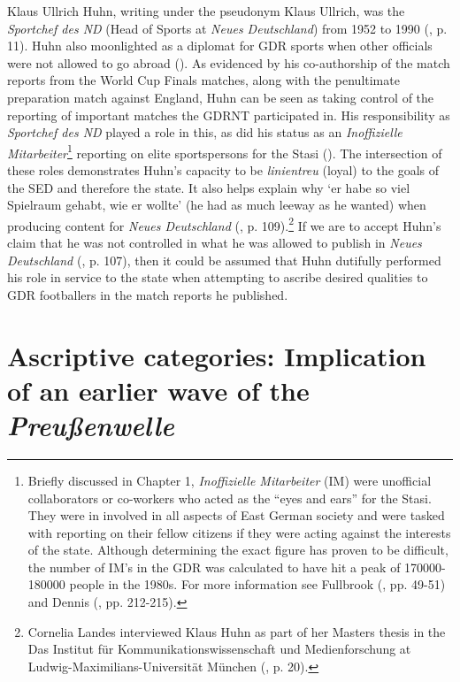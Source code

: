 Klaus Ullrich Huhn, writing under the pseudonym Klaus Ullrich, was the \textit{Sportchef des ND} (Head of Sports at \textit{Neues Deutschland}) from 1952 to 1990 (\cite{meyenfiedler2011}, p. 11). Huhn also moonlighted as a diplomat for GDR sports when other officials were not allowed to go abroad (\cite{meyenfiedler2011}). As evidenced by his co-authorship of the match reports from the World Cup Finals matches, along with the penultimate preparation match against England, Huhn can be seen as taking control of the reporting of important matches the GDRNT participated in. His responsibility as \textit{Sportchef des ND} played a role in this, as did his status as an \textit{Inoffizielle Mitarbeiter}\footnote{Briefly discussed in Chapter 1, \textit{Inoffizielle Mitarbeiter} (IM) were unofficial collaborators or co-workers who acted as the “eyes and ears” for the Stasi. They were in involved in all aspects of East German society and were tasked with reporting on their fellow citizens if they were acting against the interests of the state. Although determining the exact figure has proven to be difficult, the number of IM’s in the GDR was calculated to have hit a peak of 170000-180000 people in the 1980s. For more information see Fullbrook (\citeyear{fullbrook1995}, pp. 49-51) and Dennis (\cite{dennis2000}, pp. 212-215).} reporting on elite sportspersons for the Stasi (\cite{brinkbäumeretal1999}). The intersection of these roles demonstrates Huhn’s capacity to be \textit{linientreu} (loyal) to the goals of the SED and therefore the state. It also helps explain why ‘er habe so viel Spielraum gehabt, wie er wollte’ (he had as much leeway as he wanted) when producing content for \textit{Neues Deutschland} (\cite{landes2011}, p. 109).\footnote{Cornelia Landes interviewed Klaus Huhn as part of her Masters thesis in the Das Institut für Kommunikationswissenschaft und Medienforschung at Ludwig-Maximilians-Universität München (\cite{fiedlermeyen2011}, p. 20).} If we are to accept Huhn’s claim that he was not controlled in what he was allowed to publish in \textit{Neues Deutschland} (\cite{landes2011}, p. 107), then it could be assumed that Huhn dutifully performed his role in service to the state when attempting to ascribe desired qualities to GDR footballers in the match reports he published.

\section*{Ascriptive categories: Implication of an earlier wave of the \textit{Preußenwelle}}

